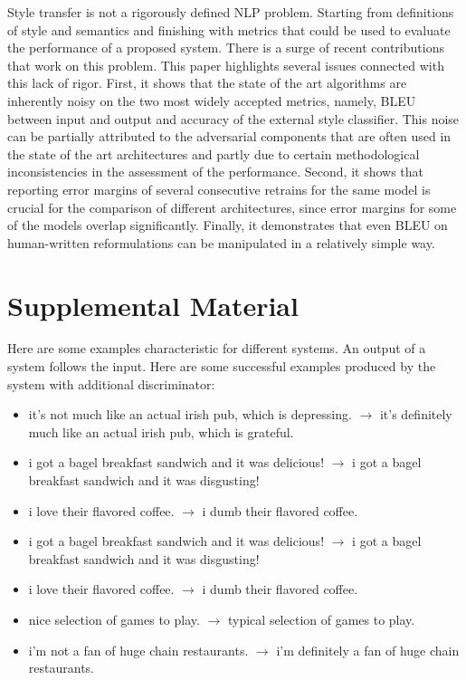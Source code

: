 \documentclass[11pt,a4paper]{article}
\begin{document}
Style transfer is not a rigorously defined NLP problem. Starting from definitions of style and semantics and finishing with metrics that could be used to evaluate the performance of a proposed system. There is a surge of recent contributions that work on this problem. This paper highlights several issues connected with this lack of rigor. First, it shows that the state of the art algorithms are inherently noisy on the two most widely accepted metrics, namely, BLEU between input and output and accuracy of the external style classifier. This noise can be partially attributed to the adversarial components that are often used in the state of the art architectures and partly due to certain methodological inconsistencies in the assessment of the performance. Second, it shows that reporting error margins of several consecutive retrains for the same model is crucial for the comparison of different architectures, since error margins for some of the models overlap significantly. Finally, it demonstrates that even BLEU on human-written reformulations can be manipulated in a relatively simple way. 






\appendix

\section{Supplemental Material}
\label{sec:appendix}
Here are some examples characteristic for different systems. An output of a system follows the input. Here are some successful examples produced by the system with additional discriminator:

\begin{itemize}
    \item it's not much like an actual irish pub, which is depressing. $\rightarrow$ it's definitely much like an actual irish pub, which is grateful.
    \item i got a bagel breakfast sandwich and it was delicious! $\rightarrow$ i got a bagel breakfast sandwich and it was disgusting!
    \item i love their flavored coffee. $\rightarrow$ i dumb their flavored coffee.
    \item i got a bagel breakfast sandwich and it was delicious! $\rightarrow$  i got a bagel breakfast sandwich and it was disgusting!
    \item i love their flavored coffee. $\rightarrow$ i dumb their flavored coffee.
    \item nice selection of games to play. $\rightarrow$ typical selection of games to play.
    \item i'm not a fan of huge chain restaurants. $\rightarrow$ i'm definitely a fan of huge chain restaurants.
\end{itemize}
\end{document}
